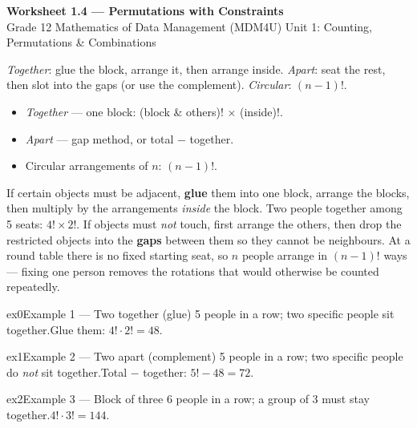 \documentclass[11pt]{article}
\begin{document}
\begin{center}
{\LARGE\bfseries\color{titleblue}Worksheet 1.4 --- Permutations with Constraints}\\[2pt]
{\small Grade 12 Mathematics of Data Management (MDM4U) \textperiodcentered{} Unit 1: Counting, Permutations \& Combinations}
\end{center}

\begin{ideabox}
\emph{Together}: glue the block, arrange it, then arrange inside. \emph{Apart}: seat the rest, then slot into the gaps (or use the complement). \emph{Circular}: $(n-1)!$.
\begin{itemize}[leftmargin=*,itemsep=2pt]
  \item \emph{Together} --- one block: (block \& others)! $\times$ (inside)!.
  \item \emph{Apart} --- gap method, or total $-$ together.
  \item Circular arrangements of $n$: $(n-1)!$.
\end{itemize}
\end{ideabox}

\begin{learnbox}
If certain objects must be adjacent, \textbf{glue} them into one block, arrange the blocks, then multiply by the arrangements \emph{inside} the block. Two people together among 5 seats: $4!\times2!$.
If objects must \emph{not} touch, first arrange the others, then drop the restricted objects into the \textbf{gaps} between them so they cannot be neighbours.
At a round table there is no fixed starting seat, so $n$ people arrange in $(n-1)!$ ways — fixing one person removes the rotations that would otherwise be counted repeatedly.
\end{learnbox}


\begin{example}{ex0}{Example 1 --- Two together (glue)}
5 people in a row; two specific people sit together.\soln Glue them: $4!\cdot2!=48$.
\end{example}

\begin{example}{ex1}{Example 2 --- Two apart (complement)}
5 people in a row; two specific people do \emph{not} sit together.\soln Total $-$ together: $5!-48=72$.
\end{example}

\begin{example}{ex2}{Example 3 --- Block of three}
6 people in a row; a group of 3 must stay together.\soln $4!\cdot3!=144$.
\end{example}
\end{document}
